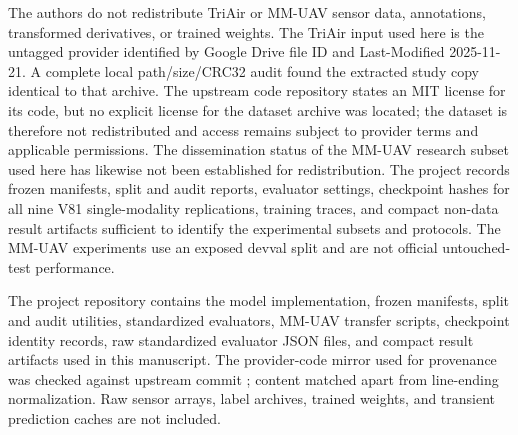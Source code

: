 The authors do not redistribute TriAir or MM-UAV sensor data, annotations, transformed derivatives, or trained weights. The TriAir input used here is the untagged provider  identified by Google Drive file ID  and Last-Modified 2025-11-21. A complete local path/size/CRC32 audit found the extracted study copy identical to that archive. The upstream code repository states an MIT license for its code, but no explicit license for the dataset archive was located; the dataset is therefore not redistributed and access remains subject to provider terms and applicable permissions. The dissemination status of the MM-UAV research subset used here has likewise not been established for redistribution. The project records frozen manifests, split and audit reports, evaluator settings, checkpoint hashes for all nine V81 single-modality replications, training traces, and compact non-data result artifacts sufficient to identify the experimental subsets and protocols. The MM-UAV experiments use an exposed devval split and are not official untouched-test performance.

The project repository contains the model implementation, frozen manifests, split and audit utilities, standardized evaluators, MM-UAV transfer scripts, checkpoint identity records, raw standardized evaluator JSON files, and compact result artifacts used in this manuscript. The provider-code mirror used for provenance was checked against upstream commit ; content matched apart from line-ending normalization. Raw sensor arrays, label archives, trained weights, and transient prediction caches are not included.

